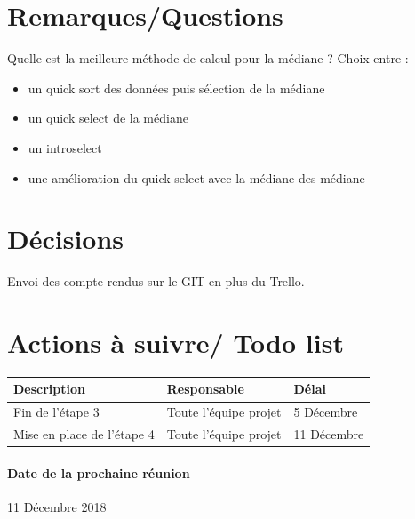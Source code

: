 \documentclass{article}
\begin{document}
\section{Remarques/Questions}
Quelle est la meilleure méthode de calcul pour la médiane ? 
Choix entre :
\begin{itemize}
  \item un quick sort des données puis sélection de la médiane 
  \item un quick select de la médiane 
  \item un introselect
  \item une amélioration du quick select avec la médiane des médiane 
\end{itemize}

\section{Décisions}
Envoi des compte-rendus sur le GIT en plus du Trello.

\section{Actions à suivre/ Todo list}

\begin{tabular}{|C{5cm}|C{3cm}|C{3cm}|}
\hline {} Description & Responsable & Délai \\
\hline  Fin de l'étape 3 & Toute l'équipe projet  & 5 Décembre  \\
\hline 
Mise en place de l'étape 4 & Toute l'équipe projet  & 11 Décembre \\
\hline
\end{tabular}

\paragraph{Date de la prochaine réunion}
11 Décembre 2018
\end{document}
